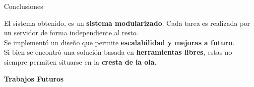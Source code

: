 \begin{frame}{Conclusiones}
    \vspace{0cm}

    El sistema obtenido, es un \textbf{sistema modularizado}. Cada tarea es realizada por un servidor de forma independiente al resto. 
    \\
    \vspace{0.5cm}
    Se implementó un diseño que permite \textbf{escalabilidad y mejoras a futuro}.
    \\
    \vspace{0.5cm}  
    Si bien se encontró una solución basada en \textbf{herramientas libres}, estas no siempre permiten situarse en la \textbf{cresta de la ola}.



\end{frame}


\begin{frame}
    \Huge
    \centering
    \textbf{Trabajos Futuros}

\end{frame}

